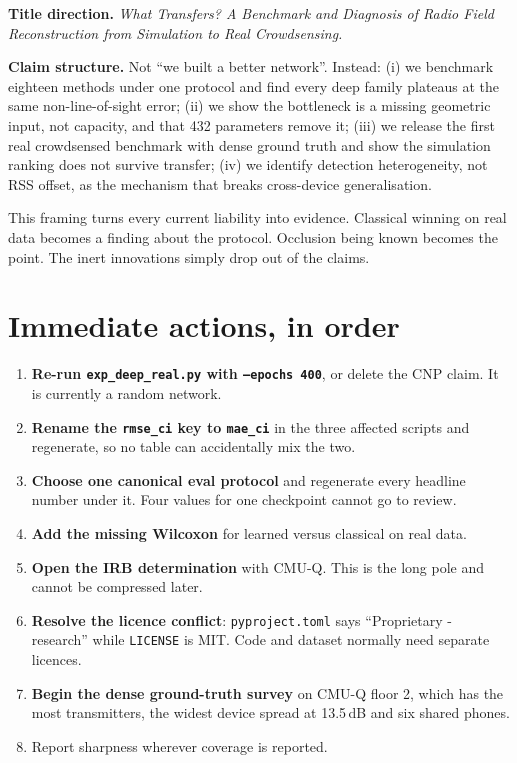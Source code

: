 \documentclass[10pt,a4paper]{article}
\begin{document}
\textbf{Title direction.} \emph{What Transfers? A Benchmark and Diagnosis of Radio Field
Reconstruction from Simulation to Real Crowdsensing.}

\textbf{Claim structure.} Not ``we built a better network''. Instead: (i) we benchmark
eighteen methods under one protocol and find every deep family plateaus at the same
non-line-of-sight error; (ii) we show the bottleneck is a missing geometric input, not
capacity, and that 432 parameters remove it; (iii) we release the first real
crowdsensed benchmark with dense ground truth and show the simulation ranking does not
survive transfer; (iv) we identify detection heterogeneity, not RSS offset, as the
mechanism that breaks cross-device generalisation.

This framing turns every current liability into evidence. Classical winning on real data
becomes a finding about the protocol. Occlusion being known becomes the point. The inert
innovations simply drop out of the claims.

\section{Immediate actions, in order}

\begin{enumerate}
\item \textbf{Re-run \texttt{exp\_deep\_real.py} with \texttt{--epochs 400}}, or delete
the CNP claim. It is currently a random network.
\item \textbf{Rename the \texttt{rmse\_ci} key to \texttt{mae\_ci}} in the three affected
scripts and regenerate, so no table can accidentally mix the two.
\item \textbf{Choose one canonical eval protocol} and regenerate every headline number
under it. Four values for one checkpoint cannot go to review.
\item \textbf{Add the missing Wilcoxon} for learned versus classical on real data.
\item \textbf{Open the IRB determination} with CMU-Q. This is the long pole and cannot be
compressed later.
\item \textbf{Resolve the licence conflict}: \texttt{pyproject.toml} says
``Proprietary - research'' while \texttt{LICENSE} is MIT. Code and dataset normally need
separate licences.
\item \textbf{Begin the dense ground-truth survey} on CMU-Q floor 2, which has the most
transmitters, the widest device spread at 13.5\,dB and six shared phones.
\item Report sharpness wherever coverage is reported.
\end{enumerate}
\end{document}
